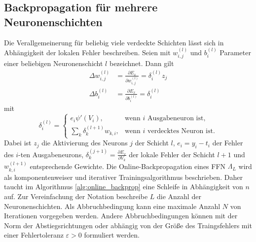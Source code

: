 \subsection*{Backpropagation für mehrere Neuronenschichten}
Die Verallgemeinerung für beliebig viele verdeckte Schichten lässt sich in Abhängigkeit der lokalen Fehler beschreiben. Seien mit $w^{(l)}_{i,j}$ und $b^{(l)}_i$ Parameter einer beliebigen Neuronenschicht $l$ bezeichnet. Dann gilt 
\begin{align*}
    \Delta w^{(l)}_{i,j}&= \frac{\partial E_x}{\partial w^{(l)}_{i,j}}= \delta^{(l)}_i z_j \\
    \Delta b^{(l)}_{i}&= \frac{\partial E_x}{\partial b^{(l)}_{i}}= \delta^{(l)}_i
\end{align*}
mit 
\begin{equation*}
    \delta^{(l)}_i=
    \begin{cases}
        e_i \psi'(V_i), &\text{wenn $i$ Ausgabeneuron ist}, \\
        \sum_{k} \delta^{(l+1)}_k w_{k,i}, &\text{wenn $i$ verdecktes Neuron ist}.
    \end{cases}
\end{equation*}
Dabei ist $z_j$ die Aktivierung des Neurons $j$ der Schicht $l$, $e_i=y_i-t_i$ der Fehler des $i$-ten Ausgabeneurons,  $\delta^{(j+1)}_k= \frac{\partial E_x}{\partial V_k}$ der lokale Fehler der Schicht $l+1$ und $w^{(l+1)}_{k,i}$ entsprechende Gewichte. 
Die Online-Backpropagation eines FFN $\Lambda_L$ wird als komponentenweiser und iterativer Trainingsalgorithmus beschrieben. Daher taucht im Algorithmus \ref{alg:online_backprop} eine Schleife in Abhängigkeit von $n$ auf. Zur Vereinfachung der Notation beschreibe $L$ die Anzahl der Neuronenschichten. Als Abbruchbedingung kann eine maximale Anzahl $N$ von Iterationen vorgegeben werden. Andere Abbruchbedingungen können mit der Norm der Abstiegsrichtungen oder abhängig von der Größe des Traingsfehlers mit einer Fehlertoleranz $\varepsilon >0$ formuliert werden.

